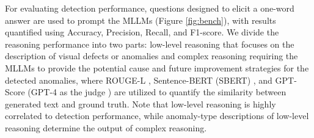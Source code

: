 For evaluating detection performance, questions designed to elicit a one-word answer are used to prompt the MLLMs (Figure \ref{fig:bench}), with results quantified using Accuracy, Precision, Recall, and F1-score. We divide the reasoning performance into two parts: low-level reasoning that focuses on the description of visual defects or anomalies and complex reasoning requiring the MLLMs to provide the potential cause and future improvement strategies for the detected anomalies, where ROUGE-L \cite{rouge}, Sentence-BERT (SBERT) \cite{sbert}, and GPT-Score (GPT-4 as the judge \cite{llava}) are utilized to quantify the similarity between generated text and ground truth. Note that low-level reasoning is highly correlated to detection performance, while anomaly-type descriptions of low-level reasoning determine the output of complex reasoning.


